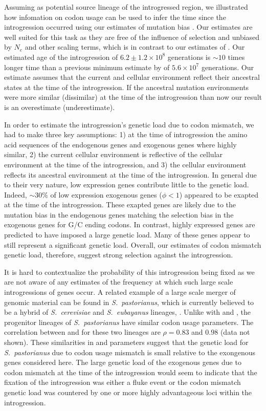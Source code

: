 \documentclass[fleqn,letterpaper]{article}
\begin{document}
Assuming \gossypii as potential source lineage of the introgressed region, we illustrated how infomation on codon usage can be used to infer the time since the introgression occurred using our estimates of mutation bias \DM.
Our \DM estimates are well suited for this task as they are free of the influence of selection and unbiased by $N_e$ and other scaling terms, which is in contrast to our estimates of \DE \citep{gilchrist2015}.
Our estimated age of the introgression of $6.2\pm1.2\times 10^8$ generations is $\sim 10$ times longer time than a previous minimum estimate by \citet{friedrich2015} of $5.6\times 10^7$ generations.
Our estimate assumes that the current \gossypii and \kluyveri cellular environment reflect their ancestral states at the time of the introgression.
If the ancestral mutation environments were more similar (dissimilar) at the time of the introgression than now our result is an overestimate (underestimate).

In order to estimate the introgression's genetic load due to codon mismatch, we had to make three key assumptions: 1) at the time of introgression the amino acid sequences of the endogenous genes and exogenous genes where highly similar, 2) the current \kluyveri cellular environment is reflective of the cellular environment at the time of the introgression, and 3) the \gossypii cellular environment reflects its ancestral environment at the time of the introgression.
In general due to their very nature, low expression genes contribute little to the genetic load.
Indeed, $\sim 30 \%$ of low expression exogenous genes ($\phi < 1$) appeared to be exapted at the time of the introgression.
These exapted genes are likely due to the mutation bias in the endogenous genes matching the selection bias in the exogenous genes for G/C ending codons.
In contrast, highly expressed genes are predicted to have imposed a large genetic load.
Many of these genes appear to still represent a significant genetic load.
Overall, our estimates of codon mismatch genetic load, therefore, suggest strong selection against the introgression.

It is hard to contextualize the probability of this introgression being fixed as we are not aware of any estimates of the frequency at which such large scale introgressions of genes occur.
A related example of a large scale merger of genomic material can be found in \emph{S.~pastorianus}, which is currently believed to be a hybrid of \emph{S.~cerevisiae} and \emph{S.~eubayanus} lineages, \citep{baker2015}.
Unlike with \kluyveri and \gossypii, the  progenitor lineages of \emph{S.~pastorianus} have similar codon usage parameters.
The correlation between \DM and \DE for these two lineages are  $\rho = 0.83$ and  $0.98$ (data not shown).
These similarities in \DM and \DE parameters suggest that the genetic load for \emph{S.~pastorianus} due to codon usage mismatch is small relative to the exongenous genes considered here. 
The large genetic load of the exogenous genes due to codon mismatch at the time of the introgression would seem to indicate that the fixation of the introgression was either a fluke event or the codon mismatch genetic load was countered by one or more highly advantageous loci within the introgression.
\end{document}
